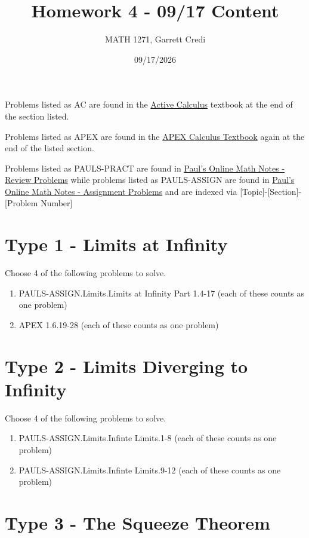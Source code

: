\documentclass[12pt]{article}
\title{Homework 4 - 09/17 Content}
\author{MATH 1271, Garrett Credi}
\date{09/17/2026}
\begin{document}
\maketitle

Problems listed as AC are found in the \href{https://activecalculus.org/single1e/frontmatter.html}{Active Calculus} 
textbook at the end of the section listed.

Problems listed as APEX are found in the \href{https://opentext.uleth.ca/apex-calculus/apex-calculus.html}{APEX Calculus Textbook}
again at the end of the listed section.

Problems listed as PAULS-PRACT are found in \href{https://tutorial.math.lamar.edu/Problems/CalcI/CalcI.aspx}{Paul's Online Math Notes - Review Problems}
while problems listed as PAULS-ASSIGN are found in \href{https://tutorial.math.lamar.edu/ProblemsNS/CalcI/CalcI.aspx}{Paul's Online Math Notes - Assignment Problems}
and are indexed via [Topic]-[Section]-[Problem Number]

\section{Type 1 - Limits at Infinity}

Choose 4 of the following problems to solve.

\begin{enumerate}
  \item PAULS-ASSIGN.Limits.Limits at Infinity Part 1.4-17 (each of these counts as one problem)
  \item APEX 1.6.19-28 (each of these counts as one problem)
\end{enumerate}

\section{Type 2 - Limits Diverging to Infinity}

Choose 4 of the following problems to solve.

\begin{enumerate}
  \item PAULS-ASSIGN.Limits.Infinte Limits.1-8 (each of these counts as one problem)
  \item PAULS-ASSIGN.Limits.Infinte Limits.9-12 (each of these counts as one problem)
\end{enumerate}

\section{Type 3 - The Squeeze Theorem}
\end{document}
